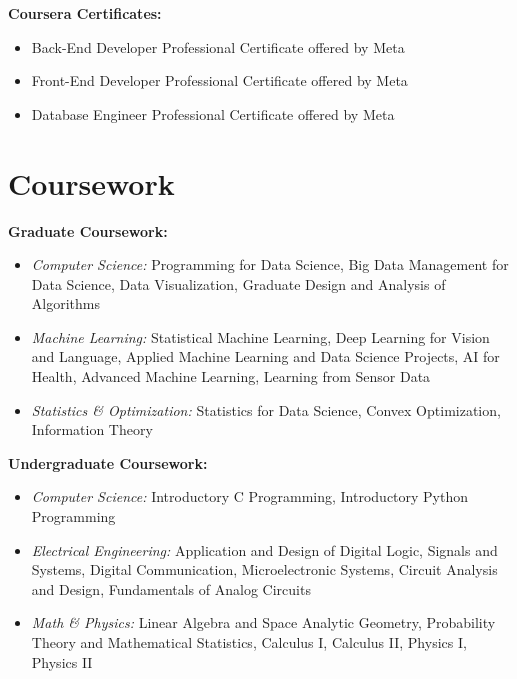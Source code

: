 \documentclass[11pt]{article}
\begin{document}
\vspace{\lineskip}

\textbf{Coursera Certificates:}

\begin{itemize}
    \item Back-End Developer Professional Certificate offered by Meta
    \item Front-End Developer Professional Certificate offered by Meta
    \item Database Engineer Professional Certificate offered by Meta
\end{itemize}

\section*{Coursework}

\textbf{Graduate Coursework:}

\begin{itemize}
    \item {\textit{Computer Science:}} Programming for Data Science, Big Data Management for Data Science, Data Visualization, Graduate Design and Analysis of Algorithms
    \item {\textit{Machine Learning:}} Statistical Machine Learning, Deep Learning for Vision and Language, Applied Machine Learning and Data Science Projects, AI for Health, Advanced Machine Learning, Learning from Sensor Data
    \item {\textit{Statistics \& Optimization:}} Statistics for Data Science, Convex Optimization, Information Theory
\end{itemize}

\vspace{\lineskip}

\textbf{Undergraduate Coursework:}

\begin{itemize}
    \item {\textit{Computer Science:}} Introductory C Programming, Introductory Python Programming
    \item {\textit{Electrical Engineering:}} Application and Design of Digital Logic, Signals and Systems, Digital Communication, Microelectronic Systems, Circuit Analysis and Design, Fundamentals of Analog Circuits
    \item {\textit{Math \& Physics:}} Linear Algebra and Space Analytic Geometry, Probability Theory and Mathematical Statistics, Calculus I, Calculus II, Physics I, Physics II
\end{itemize}
	
\end{document}
